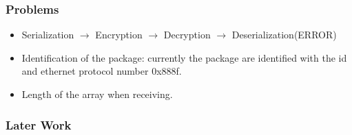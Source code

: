 \documentclass[11pt]{beamer}
\begin{document}
\begin{frame}
\begin{multicols}{2}
\end{multicols}
\end{frame}

\begin{frame}\frametitle{Problems}
\begin{itemize}
\item Serialization $\rightarrow$ Encryption $\rightarrow$ Decryption $\rightarrow$ Deserialization(ERROR)

\item Identification of the package: currently the package are identified with the  id and ethernet protocol number 0x888f.

\item Length of the array when receiving.
\end{itemize}
\end{frame}

\begin{frame}\frametitle{Later Work}

\end{frame}
\end{document}
